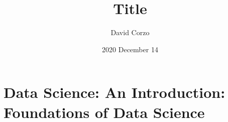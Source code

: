 \documentclass{book}
\title{Title}
\date{2020 December 14} %
\author{David Corzo}
\begin{document}
\maketitle
\tableofcontents

\part{Data Science: An Introduction: Foundations of Data Science}




\end{document}
